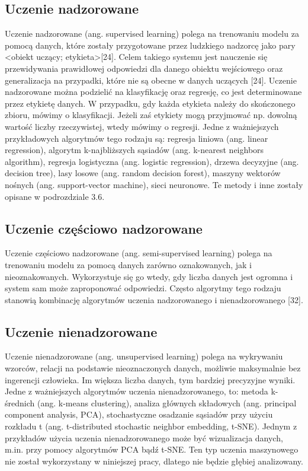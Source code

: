 \subsection{Uczenie nadzorowane}
\label{cha:cha3.2.1}

Uczenie nadzorowane (ang. supervised learning) polega na trenowaniu modelu za pomocą danych, które zostały przygotowane przez ludzkiego nadzorcę jako pary <obiekt uczący; etykieta>[24]. Celem takiego systemu jest nauczenie się przewidywania prawidłowej odpowiedzi dla danego obiektu wejściowego oraz generalizacja na przypadki, które nie są obecne w danych uczących [24]. 
Uczenie nadzorowane można podzielić na klasyfikację oraz regresję, co jest determinowane przez etykietę danych. W przypadku, gdy każda etykieta należy do skończonego zbioru, mówimy o klasyfikacji. Jeżeli zaś etykiety mogą przyjmować np. dowolną wartość liczby rzeczywistej, wtedy mówimy o regresji. Jedne z ważniejszych przykładowych algorytmów tego rodzaju są:
regresja liniowa (ang. linear regression),
algorytm k-najbliższych sąsiadów (ang. k-nearest neighbors algorithm),
regresja logistyczna (ang. logistic regression),
drzewa decyzyjne (ang. decision tree),
lasy losowe (ang. random decision forest),
maszyny wektorów nośnych (ang. support-vector machine),
sieci neuronowe.
Te metody i inne zostały opisane w podrozdziale 3.6. 

\subsection{Uczenie częściowo nadzorowane}
\label{cha:cha3.2.2}

Uczenie częściowo nadzorowane (ang. semi-supervised learning) polega na trenowaniu modelu za pomocą danych zarówno oznakowanych, jak i nieoznakowanych. Wykorzystuje się go wtedy, gdy liczba danych jest ogromna i system sam może zaproponować odpowiedzi. Często algorytmy tego rodzaju stanowią kombinację algorytmów uczenia nadzorowanego i nienadzorowanego [32].

\subsection{Uczenie nienadzorowane}
\label{cha:cha3.2.3}

Uczenie nienadzorowane (ang. unsupervised learning) polega na wykrywaniu wzorców, relacji na podstawie nieoznaczonych danych, możliwie maksymalnie bez ingerencji człowieka. Im większa liczba danych, tym bardziej precyzyjne wyniki. Jedne z ważniejszych algorytmów uczenia nienadzorowanego, to:
metoda k-średnich (ang. k-means clustering),
analiza głównych składowych (ang. principal component analysis, PCA),
stochastyczne osadzanie sąsiadów przy użyciu rozkładu t (ang. t-distributed stochastic neighbor embedding, t-SNE).
Jednym z przykładów użycia uczenia nienadzorowanego może być wizualizacja danych, m.in. przy pomocy algorytmów PCA bądź t-SNE. Ten typ uczenia maszynowego nie został wykorzystany w niniejszej pracy, dlatego nie będzie głębiej analizowany.

